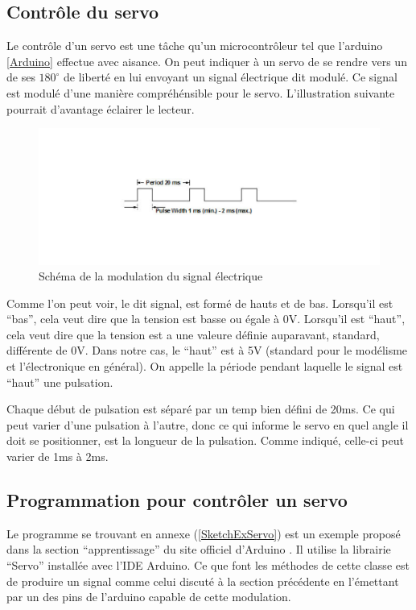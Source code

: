 \documentclass[a4paper,12pt]{report}
\begin{document}
{\subsection{Contrôle du servo}
Le contr\^ole d'un servo est une tâche qu'un microcontr\^oleur tel que
l'arduino \ref{Arduino} effectue avec aisance. On peut indiquer \`a un servo de se rendre vers
un de ses $180^{\circ}$ de libert\'e en lui envoyant un signal \'electrique dit
modul\'e. Ce signal est modul\'e d'une mani\`ere compréh\'ensible pour le
servo. L'illustration suivante
pourrait d'avantage \'eclairer le lecteur.

\begin{figure}[h]
\centering
\includegraphics[width=1.0\textwidth]{figures/ServoPwm}
    \caption{\label{ServoPwm}Sch\'ema de la modulation du signal
      \'electrique \protect
      \cite{WikiServo}
    }
\end{figure}

Comme l'on peut voir, le dit signal, est form\'e de hauts et de
bas. Lorsqu'il est ``bas'', cela veut dire que la tension est basse ou \'egale
\`a 0V. Lorsqu'il est
``haut'', cela veut dire que la tension est a une valeure d\'efinie auparavant,
standard, diff\'erente de 0V. Dans notre cas, le ``haut'' est \`a 5V (standard
pour le mod\'elisme et l'\'electronique en g\'en\'eral). On appelle la
p\'eriode pendant laquelle le signal est ``haut'' une pulsation.

Chaque d\'ebut de pulsation est s\'epar\'e par un temp bien d\'efini de
20ms. Ce qui peut varier d'une pulsation \`a l'autre, donc ce qui informe le
servo en quel angle il doit se positionner, est la longueur de la
pulsation. Comme indiqu\'e, celle-ci peut varier de 1ms \`a 2ms.

\subsection{Programmation pour contr\^oler un servo}
Le programme se trouvant en annexe (\ref{SketchExServo}) est un exemple propos\'e dans la section
``apprentissage'' du site officiel d'Arduino \cite{ServoSweep}. Il utilise la librairie
``Servo'' install\'ee avec l'IDE Arduino. Ce que font les m\'ethodes de cette
classe est de produire un signal comme celui discut\'e \`a la section
pr\'ec\'edente en l'émettant par un des pins de l'arduino capable de cette
modulation. 



}
\end{document}
